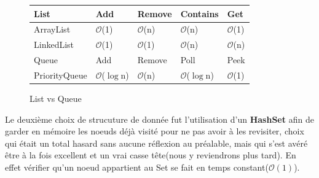 \documentclass[12pt]{article}
\begin{document}
	\begin{figure}[h!]
	\begin{tabular}{||p{4cm}|>{\centering\arraybackslash}p{2cm}|>{\centering\arraybackslash}p{2cm}|>{\centering\arraybackslash}p{2cm}|>{\centering\arraybackslash}p{2cm}||}
		\hline
			\rowcolor{blue!50}
			List & Add & Remove & Contains & Get\\
		\hline
			ArrayList & $\mathcal{O}$(1) & $\mathcal{O}$(n) & $\mathcal{O}$(n) & $\mathcal{O}$(1)\\
			LinkedList & $\mathcal{O}$(1) & $\mathcal{O}$(1) & $\mathcal{O}$(n) & $\mathcal{O}$(n)\\
		\hline
			\rowcolor{green!50}
			Queue & Add & Remove & Poll & Peek\\
		\hline
			PriorityQueue & $\mathcal{O}$($\log$n) & $\mathcal{O}$(n) & $\mathcal{O}$($\log$n) & $\mathcal{O}$(1)\\	
		\hline
	\end{tabular}	
	\caption{List vs Queue}
	\label{struct}
	\end{figure}

	Le deuxième choix de strucuture de donnée fut l'utilisation d'un \textbf{HashSet} afin de garder en mémoire les noeuds déjà visité pour ne 
	pas avoir à les revisiter, choix qui était un total hasard sans aucune réflexion au préalable, mais qui s'est avéré être à la fois excellent et un vrai 
	casse tête(nous y reviendrons plus tard). En effet vérifier qu'un noeud appartient au Set se fait en temps constant($\mathcal{O}(1)$).
	
\end{document}
